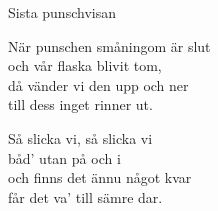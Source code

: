 \begin{song}{Sista punschvisan}
	
	
	
	
	När punschen småningom är slut\\
	och vår flaska blivit tom,\\
	då vänder vi den upp och ner\\
	till dess inget rinner ut.\\
	\begin{repetition}
		Så slicka vi, så slicka vi\\
		båd' utan på och i\\
		och finns det ännu något kvar\\
		får det va' till sämre dar.
	\end{repetition}
	
\end{song}

